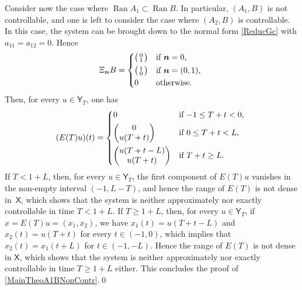\documentclass[JEP,XML,SOM,Unicode]{cedram}
\newcommand{\bn}{\boldsymbol{n}}
\newenvironment{smallpmatrix}{\big(\begin{smallmatrix}}{\end{smallmatrix}\big)}
\theoremstyle{plain}
\theoremstyle{definition}
\DeclareMathOperator{\range}{Ran}
\begin{document}
Consider now the case where $\range A_1 \subset \range B$. In particular, $(A_1, B)$ is not controllable, and one is left to consider the case where $(A_2, B)$ is controllable. In this case, the system can be brought down to the normal form \eqref{ReducGc} with $a_{11} = a_{12} = 0$. Hence
\begin{equation}%
\Xi_{\bn} B =
\begin{dcases*}
\begin{smallpmatrix}0 \\ 1 \\\end{smallpmatrix} & if $\bn = 0$, \\
\begin{smallpmatrix}1 \\ 0 \\\end{smallpmatrix} & if $\bn = (0, 1)$, \\
0 & otherwise.
\end{dcases*}
\end{equation}
Then, for every $u \in \mathsf Y_T$, one has
\begin{equation}
\label{Case3ExplicitE}
(E(T) u)(t) =
\begin{dcases*}
0 & if $-1 \leq T + t < 0$, \\
\begin{pmatrix}0 \\ u(T + t)\end{pmatrix} & if $0 \leq T + t < L$, \\
\begin{pmatrix} u(T + t - L) \\ u(T + t)\end{pmatrix} & if $T + t \geq L$.
\end{dcases*}
\end{equation}
If $T < 1 + L$, then, for every $u \in \mathsf Y_T$, the first component of $E(T) u$ vanishes in the non-empty interval $(-1, L - T)$, and hence the range of $E(T)$ is not dense in~$\mathsf X$, which shows that the system is neither approximately nor exactly controllable in time $T < 1 + L$. If $T \geq 1 + L$, then, for every $u \in \mathsf Y_T$, if $x = E(T) u = (x_1, x_2)$, we have $x_1(t) = u(T + t - L)$ and $x_2(t) = u(T + t)$ for every $t \in (-1, 0)$, which implies that $x_2(t) = x_1(t + L)$ for $t \in (-1, -L)$. Hence the range of $E(T)$ is not dense in $\mathsf X$, which shows that the system is neither approximately nor exactly controllable in time $T \geq 1 + L$ either. This concludes the proof of \eqref{MainTheoA1BNonContr}.\qed
\end{document}
